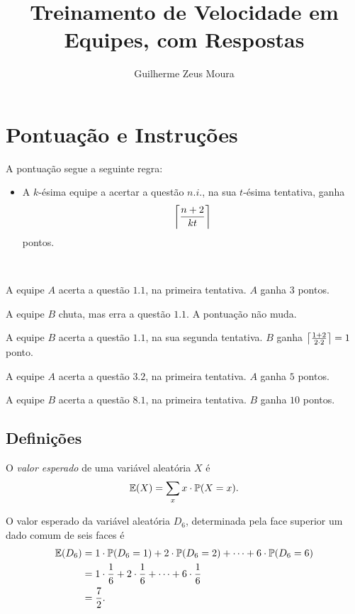 \documentclass[10pt, a4paper]{article}
\title{Treinamento de Velocidade em Equipes, com Respostas}
\author{Guilherme Zeus Moura}
\begin{document}
	
	\zeustitle

	\setcounter{section}{-1}

	\section{Pontuação e Instruções}
	
	A pontuação segue a seguinte regra:
	\begin{itemize}
		\item A $k$-ésima equipe a acertar a questão $n.i.$, na sua $t$-ésima tentativa, ganha
			\[\left \lceil{\frac{n+2}{kt}}\right \rceil\]
			pontos.
	\end{itemize}

	\begin{exmp}
		~

		A equipe $A$ acerta a questão $1.1$, na primeira tentativa. $A$ ganha $3$ pontos.

		A equipe $B$ chuta, mas erra a questão $1.1$. A pontuação não muda.

	A equipe $B$ acerta a questão $1.1$, na sua segunda tentativa. $B$ ganha $\left \lceil{\frac{1+2}{2\cdot 2}}\right \rceil = 1$ ponto.

		A equipe $A$ acerta a questão $3.2$, na primeira tentativa. $A$ ganha $5$ pontos.

		A equipe $B$ acerta a questão $8.1$, na primeira tentativa. $B$ ganha $10$ pontos.
	\end{exmp}

	\subsection{Definições}

	\begin{defn}
		O \emph{valor esperado} de uma variável aleatória $X$ é \[\mathbb{E}(X) = \sum_{x} x\cdot \mathbb{P}(X = x).\]
	\end{defn}

	\begin{exmp}
		O valor esperado da variável aleatória $D_6$, determinada pela face superior um dado comum de seis faces é 
	\begin{align*}
		\mathbb{E}(D_6) & = 1\cdot\mathbb{P}(D_6 = 1) + 2 \cdot \mathbb{P}(D_6 = 2) + \cdots + 6\cdot \mathbb{P}(D_6 = 6) \\
				 & = 1\cdot\frac{1}{6} + 2 \cdot \frac{1}{6} + \cdots + 6 \cdot \frac{1}{6} \\
				 & = \frac{7}{2}.
	\end{align*}
	\end{exmp}
\end{document}
